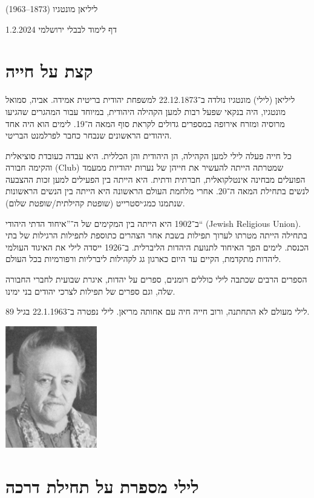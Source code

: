 \documentclass[14pt, article, extrafontsizes, twopage, a4paper]{memoir}
\begin{document}
{
  \centering
  \LARGE ליליאן מונטגיו (1873–1963)

  \Large דף לימוד לבבלי ירושלמי 1.2.2024

}

\chapter{קצת על חייה}

ליליאן (לילי) מונטגיו נולדה ב־22.12.1873 למשפחת יהודית בריטית אמידה. אביה, סמואל מונטגיו, היה בנקאי שפעל רבות למען הקהילה היהודית, במיוחד עבור המהגרים שהגיעו מרוסיה ומזרח אירופה במספרים גדולים לקראת סוף המאה ה־19. לימים הוא היה אחד היהודים הראשונים שנבחר כחבר לפרלמנט הבריטי.

כל חייה פעלה לילי למען הקהילה, הן היהודית והן הכללית. היא עבדה כעובדת סוציאלית והקימה חבורה (\textenglish{Club}) שמטרתה הייתה להעשיר את חייהן של נערות יהודיות ממעמד הפועלים מבחינה אינטלקואלית, חברתית ודתית. היא הייתה בין הפעילים למען זכות ההצבעה לנשים בתחילת המאה ה־20. אחרי מלחמת העולם הראשונה היא הייתה בין הנשים הראשונות שנתמנו כמג׳יסטרייט (שופטת קהילתית/שופטת שלום).

ב־1902 היא הייתה בין המקימים של ה־”איחוד הדתי היהודי“ (\textenglish{Jewish Religious Union}). בתחילה הייתה מטרתו לערוך תפילות בשבת אחר הצהרים כתוספת לתפילות הרגילות של בתי הכנסת. לימים הפך האיחוד לתנועת היהדות הליברלית. ב־1926 ייסדה לילי את האיגוד העולמי ליהדות מתקדמת, הקיים עד היום כארגון גג לקהילות ליברליות ורפורמיות בכל העולם.

הספרים הרבים שכתבה לילי כוללים רומנים, ספרים על יהדות, איגרת שבועית לחברי החבורה שלה, וגם ספרים של תפילות לצרכי יהודים בני ימינו.

לילי מעולם לא התחתנה, ורוב חייה חיה עם אחותה מריאן. לילי נפטרה ב־22.1.1963 בגיל 89.

{
  \centering
\includegraphics[width=4cm]{lilyolder.png}\\

}


\chapter{לילי מספרת על תחילת דרכה}
\end{document}
